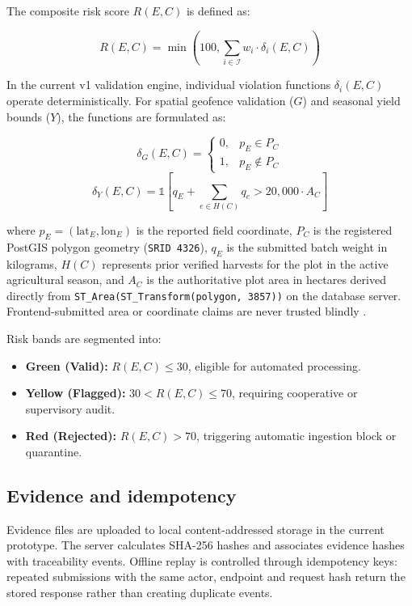 \documentclass[runningheads]{llncs}
\begin{document}
The composite risk score $R(E, C)$ is defined as:

\begin{equation}
R(E, C) = \min\left(100, \sum_{i\in\mathcal{I}} w_i \cdot \delta_i(E, C)\right)
\end{equation}

In the current v1 validation engine, individual violation functions $\delta_i(E, C)$ operate deterministically. For spatial geofence validation ($G$) and seasonal yield bounds ($Y$), the functions are formulated as:

\begin{equation}
\delta_G(E, C) =
\begin{cases}
0, & p_E \in P_C \\
1, & p_E \notin P_C
\end{cases}
\end{equation}
\begin{equation}
\delta_Y(E, C) = \mathbb{1}\left[
q_E + \sum_{e\in H(C)} q_e > 20{,}000 \cdot A_C
\right]
\end{equation}

where $p_E = (\text{lat}_E, \text{lon}_E)$ is the reported field coordinate, $P_C$ is the registered PostGIS polygon geometry (\texttt{SRID 4326}), $q_E$ is the submitted batch weight in kilograms, $H(C)$ represents prior verified harvests for the plot in the active agricultural season, and $A_C$ is the authoritative plot area in hectares derived directly from \texttt{ST\_Area(ST\_Transform(polygon, 3857))} on the database server. Frontend-submitted area or coordinate claims are never trusted blindly \cite{Alishtaev2021}.

Risk bands are segmented into:
\begin{itemize}
    \item \textbf{Green (Valid):} $R(E, C) \leq 30$, eligible for automated processing.
    \item \textbf{Yellow (Flagged):} $30 < R(E, C) \leq 70$, requiring cooperative or supervisory audit.
    \item \textbf{Red (Rejected):} $R(E, C) > 70$, triggering automatic ingestion block or quarantine.
\end{itemize}

\subsection{Evidence and idempotency}

Evidence files are uploaded to local content-addressed storage in the current prototype. The server calculates SHA-256 hashes and associates evidence hashes with traceability events. Offline replay is controlled through idempotency keys: repeated submissions with the same actor, endpoint and request hash return the stored response rather than creating duplicate events.
\end{document}
